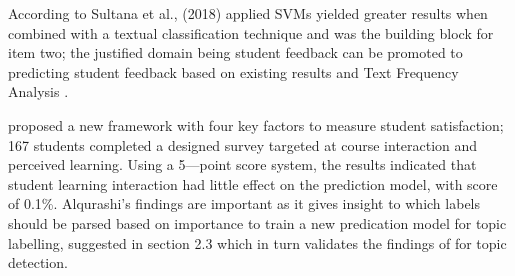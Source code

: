 According to Sultana et al., (2018) applied SVMs yielded greater results when combined with a textual classification technique and was the building block for item two; the justified domain being student feedback can be promoted to predicting student feedback based on existing results and Text Frequency Analysis \parencite{alqurashi2019predicting}.

\textcite{alqurashi2019predicting} proposed a new framework with four key factors to measure student satisfaction; 167 students completed a designed survey targeted at course interaction and perceived learning. Using a 5---point score system, the results indicated that student learning interaction had little effect on the prediction model, with score of 0.1\%. Alqurashi’s findings are important as it gives insight to which labels should be parsed based on importance to train a new predication model for topic labelling, suggested in section 2.3 which in turn validates the findings of \parencite{unankard2019topic} for topic detection.
